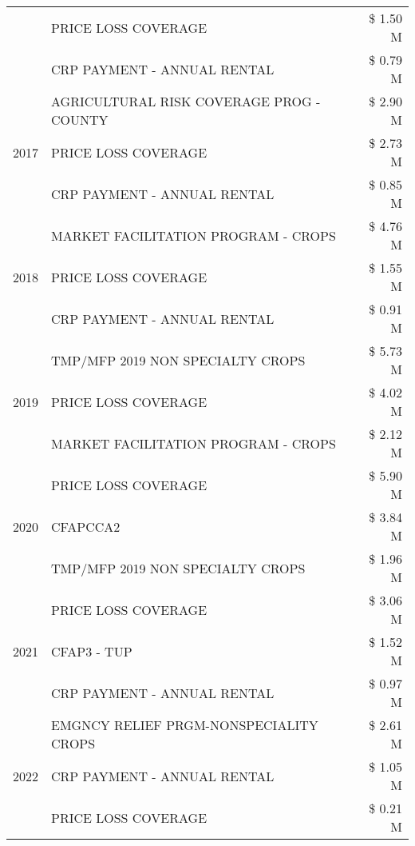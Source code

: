 \begin{tabular}{llr}
 & PRICE LOSS COVERAGE & \$ 1.50 M \\
 & CRP PAYMENT - ANNUAL RENTAL & \$ 0.79 M \\
\cline{1-3}
\multirow[t]{3}{*}{2017} & AGRICULTURAL RISK COVERAGE PROG - COUNTY & \$ 2.90 M \\
 & PRICE LOSS COVERAGE & \$ 2.73 M \\
 & CRP PAYMENT - ANNUAL RENTAL & \$ 0.85 M \\
\cline{1-3}
\multirow[t]{3}{*}{2018} & MARKET FACILITATION PROGRAM - CROPS & \$ 4.76 M \\
 & PRICE LOSS COVERAGE & \$ 1.55 M \\
 & CRP PAYMENT - ANNUAL RENTAL & \$ 0.91 M \\
\cline{1-3}
\multirow[t]{3}{*}{2019} & TMP/MFP 2019 NON SPECIALTY CROPS & \$ 5.73 M \\
 & PRICE LOSS COVERAGE & \$ 4.02 M \\
 & MARKET FACILITATION PROGRAM - CROPS & \$ 2.12 M \\
\cline{1-3}
\multirow[t]{3}{*}{2020} & PRICE LOSS COVERAGE & \$ 5.90 M \\
 & CFAPCCA2 & \$ 3.84 M \\
 & TMP/MFP 2019 NON SPECIALTY CROPS & \$ 1.96 M \\
\cline{1-3}
\multirow[t]{3}{*}{2021} & PRICE LOSS COVERAGE & \$ 3.06 M \\
 & CFAP3 - TUP & \$ 1.52 M \\
 & CRP PAYMENT - ANNUAL RENTAL & \$ 0.97 M \\
\cline{1-3}
\multirow[t]{3}{*}{2022} & EMGNCY RELIEF PRGM-NONSPECIALITY CROPS & \$ 2.61 M \\
 & CRP PAYMENT - ANNUAL RENTAL & \$ 1.05 M \\
 & PRICE LOSS COVERAGE & \$ 0.21 M \\
\cline{1-3}
\bottomrule
\end{tabular}
